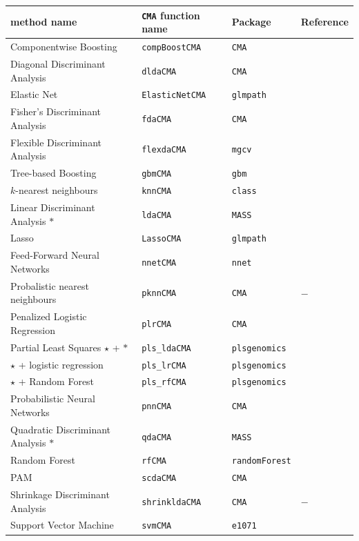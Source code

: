 \begin{table}
\begin{tabular}[h!]{llll} \label{methodsoverview}
\textbf{method name} &\texttt{CMA} \textbf{function name} & \textbf{Package} & \textbf{Reference} \\
\hline
Componentwise Boosting & \texttt{compBoostCMA} &  \texttt{CMA} & \citet{Buhlmann2003} \\
Diagonal Discriminant Analysis & \texttt{dldaCMA}      &  \texttt{CMA} & \citet{dabook} \\
Elastic Net & \texttt{ElasticNetCMA} & \texttt{glmpath} & \citet{elasticnet} \\
Fisher's Discriminant Analysis& \texttt{fdaCMA} &   \texttt{CMA}          & \citet{Ripley1996} \\
Flexible Discriminant Analysis & \texttt{flexdaCMA} & \texttt{mgcv}    &  \citet{Ripley1996} \\ 
Tree-based Boosting &\texttt{gbmCMA} & \texttt{gbm} &   \citet{Friedman2001} \\
$k$-nearest neighbours & \texttt{knnCMA} & \texttt{class}             &   \citet{Ripley1996} \\
Linear Discriminant Analysis ${\ast}$ & \texttt{ldaCMA}      &  \texttt{MASS} & \citet{dabook} \\
Lasso & \texttt{LassoCMA}      &  \texttt{glmpath} & \citet{glmpath} \\
Feed-Forward Neural Networks & \texttt{nnetCMA} & \texttt{nnet} & \citet{Ripley1996} \\
Probalistic nearest neighbours & \texttt{pknnCMA} & \texttt{CMA} & $-$ \\
Penalized Logistic Regression & \texttt{plrCMA} & \texttt{CMA} &
\citet{Zhu2004} \\
Partial Least Squares ${\star}$ + $\ast$ & \verb+pls_ldaCMA+ & \texttt{plsgenomics} &
\citet{Boulesteixpls} \\
$\star$ + logistic regression & \verb+pls_lrCMA+ & \texttt{plsgenomics} & \citet{Boulesteixpls} \\
$\star$ + Random Forest & \verb+pls_rfCMA+ & \texttt{plsgenomics} & \citet{Boulesteixpls} \\
Probabilistic Neural Networks & \texttt{pnnCMA} &  \texttt{CMA} &
\citet{specht} \\
Quadratic Discriminant Analysis ${\ast}$ & \texttt{qdaCMA}      &  \texttt{MASS} & \citet{dabook} \\ 
Random Forest &\texttt{rfCMA} & \texttt{randomForest} &   \citet{Breiman2001} \\
PAM & \texttt{scdaCMA} & \texttt{CMA} & \citet{Tibshirani2002}   \\
Shrinkage Discriminant Analysis & \texttt{shrinkldaCMA} & \texttt{CMA} &  $-$ \\
Support Vector Machine & \texttt{svmCMA} &  \texttt{e1071} &
\citet{ScholkopfSmola2002} \\
\hline
\end{tabular}
\label{tab:methods}
\end{table}



